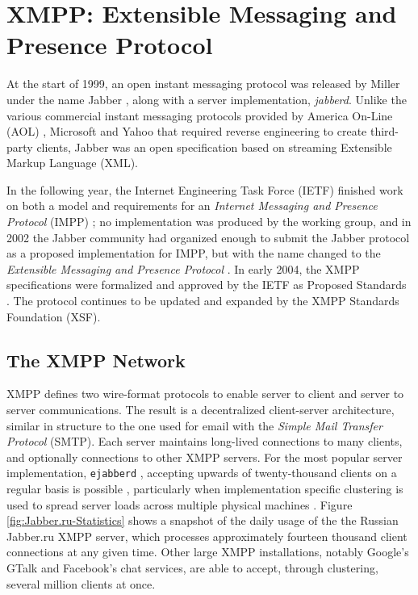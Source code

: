 \chapter{XMPP: Extensible Messaging and Presence Protocol}
\label{chap:XMPP}

At the start of 1999, an open instant messaging protocol was released by Miller
under the name Jabber \cite{XSF-History}, along with a server implementation,
\textit{jabberd}. Unlike the various commercial instant messaging protocols
provided by America On-Line (AOL) \cite{AIM}, Microsoft \cite{MSN} and Yahoo
\cite{Yahoo} that required reverse engineering to create third-party clients,
Jabber was an open specification based on streaming Extensible Markup Language
(XML).

In the following year, the Internet Engineering Task Force (IETF) finished work
on both a model and requirements for an \textit{Internet Messaging and Presence
Protocol} (IMPP) \cite{RFC2778}\cite{RFC2779}; no implementation was produced
by the working group, and in 2002 the Jabber community had organized enough
to submit the Jabber protocol as a proposed implementation for IMPP, but with
the name changed to the \textit{Extensible Messaging and Presence Protocol}
\cite{RFC3920}\cite{RFC3921}. In early 2004, the XMPP specifications were
formalized and approved by the IETF as Proposed Standards \cite{XSF-History}.
The protocol continues to be updated and expanded by the XMPP Standards
Foundation (XSF).

\section{The XMPP Network}
\label{sec:The-XMPP-Network}

XMPP defines two wire-format protocols to enable server to client and server to
server communications. The result is a decentralized client-server architecture,
similar in structure to the one used for email with the \textit{Simple Mail
Transfer Protocol} (SMTP). Each server maintains long-lived connections
to many clients, and optionally connections to other XMPP servers. For
the most popular server implementation, \texttt{ejabberd} \cite{ejabberd}
\cite{XSF-Services}, accepting upwards of twenty-thousand clients on a regular
basis is possible \cite{Jabber.ru}, particularly when implementation specific
clustering is used to spread server loads across multiple physical machines
\cite{ejabberd-cluster}. Figure \ref{fig:Jabber.ru-Statistics} shows a snapshot
of the daily usage of the the Russian Jabber.ru XMPP server, which processes
approximately fourteen thousand client connections at any given time. Other
large XMPP installations, notably Google's GTalk \cite{GTalk} and Facebook's
chat \cite{Facebook} services, are able to accept, through clustering, several
million clients at once.

